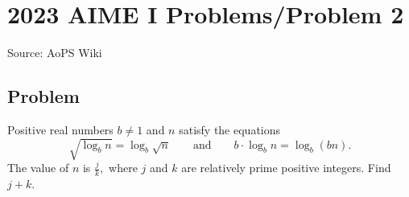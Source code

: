 \documentclass[12pt]{article}
\begin{document}
\section*{{2023 AIME I Problems/Problem 2}}
Source: AoPS Wiki

\subsection*{Problem}
Positive real numbers $b \not= 1$ and $n$ satisfy the equations \[\sqrt{\log_b n} = \log_b \sqrt{n} \qquad \text{and} \qquad b \cdot \log_b n = \log_b (bn).\] The value of $n$ is $\frac{j}{k},$ where $j$ and $k$ are relatively prime positive integers. Find $j+k.$
\end{document}
